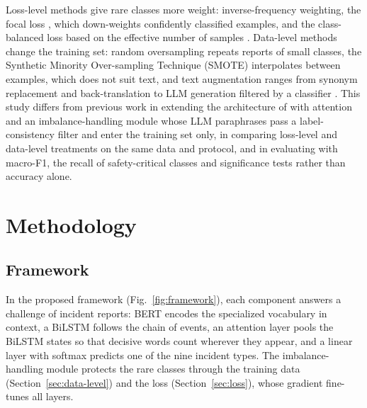 \documentclass[conference]{IEEEtran}
\begin{document}
Loss-level methods give rare classes more weight: inverse-frequency weighting, the focal loss \cite{lin2020focal}, which down-weights confidently classified examples, and the class-balanced loss based on the effective number of samples \cite{zhang2023longtailed}. Data-level methods change the training set: random oversampling repeats reports of small classes, the Synthetic Minority Over-sampling Technique (SMOTE) \cite{chawla2002smote} interpolates between examples, which does not suit text, and text augmentation ranges from synonym replacement and back-translation to LLM generation filtered by a classifier \cite{bayer2022survey}. This study differs from previous work in extending the architecture of \cite{zhao2025causation} with attention and an imbalance-handling module whose LLM paraphrases pass a label-consistency filter and enter the training set only, in comparing loss-level and data-level treatments on the same data and protocol, and in evaluating with macro-F1, the recall of safety-critical classes and significance tests rather than accuracy alone.

\section{Methodology}\label{sec:method}

\subsection{Framework}

In the proposed framework (Fig.~\ref{fig:framework}), each component answers a challenge of incident reports: BERT encodes the specialized vocabulary in context, a BiLSTM follows the chain of events, an attention layer pools the BiLSTM states so that decisive words count wherever they appear, and a linear layer with softmax predicts one of the nine incident types. The imbalance-handling module protects the rare classes through the training data (Section~\ref{sec:data-level}) and the loss (Section~\ref{sec:loss}), whose gradient fine-tunes all layers.
\end{document}

